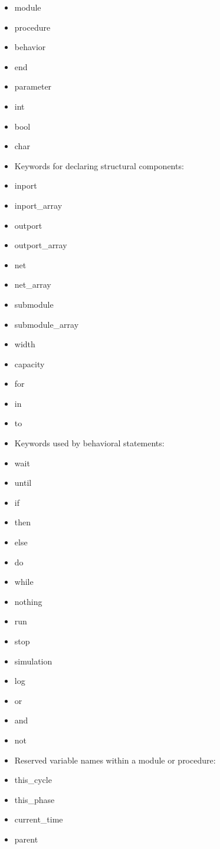 \documentclass[12pt,a4paper]{report}
\begin{document}
	
	\begin{itemize}
	
	\item module
	\item procedure
	\item behavior
	\item end
	\item parameter
	\item int
	\item bool
	\item char
	
	\item[] Keywords for declaring structural components:
	
	\item inport
	\item inport\_array
	\item outport
	\item outport\_array
	\item net
	\item net\_array
	\item submodule
	\item submodule\_array
	\item width
	\item capacity
	\item for
	\item in
	\item to
	
	\item[] Keywords used by behavioral statements:
	\item wait
	\item until
	\item if
	\item then
	\item else
	\item do
	\item while
	\item nothing
	\item run
	\item stop
	\item simulation
	\item log
	\item or
	\item and
	\item not
	
	\item[]Reserved variable names within a module or procedure:
	\item this\_cycle	
	\item this\_phase
	\item current\_time
	\item parent
	\end{itemize}
	
\end{document}
